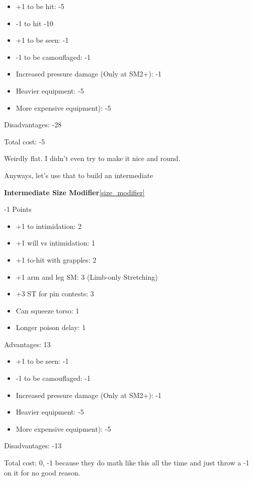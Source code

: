 \begin{multicols*}{2}
	\begin{itemize}
		\itemsep 0pt
		\item 	+1 to be hit: -5
		\item 	-1 to hit -10
		\item 	+1 to be seen: -1
		\item 	-1 to be camouflaged: -1
		\item 	Increased pressure damage (Only at SM2+): -1
		\item 	Heavier equipment: -5
		\item 	More expensive equipment): -5
	\end{itemize}
	Disadvantages: -28
	
	Total cost: -5
	
	Weirdly flat. I didn't even try to make it nice and round.
	
	Anyways, let's use that to build an intermediate
	
	\textbf{Intermediate Size Modifier}\ref{size_modifier}
	\begin{flushright}
		-1 Points
	\end{flushright}

	\begin{itemize}
		\itemsep 0pt
		\item 	+1 to intimidation: 2
		\item 	+1 will vs intimidation: 1
		\item 	+1 to-hit with grapples: 2
		\item 	+1 arm and leg SM: 3 (Limb-only Stretching)
		\item 	+3 ST for pin contests: 3
		\item 	Can squeeze torso: 1
		\item 	Longer poison delay: 1
	\end{itemize}
	Advantages: 13
	
	\begin{itemize}
		\itemsep 0pt
		\item 	+1 to be seen: -1
		\item 	-1 to be camouflaged: -1
		\item 	Increased pressure damage (Only at SM2+): -1
		\item 	Heavier equipment: -5
		\item 	More expensive equipment): -5
	\end{itemize}
	Disadvantages: -13
	
	Total cost: 0, -1 because they do math like this all the time and just throw a -1 on it for no good reason.
		

\end{multicols*}
